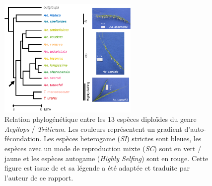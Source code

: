 \documentclass[../main]{subfiles} %
\begin{document}
\addto\extrasfrench{\protected\edef:{\unexpanded\expandafter{:}}}

\begin{figure}[ht]
    \centering
    \includegraphics[width=0.60\textwidth]{./Illustrations/phylogenetic-relationships-modified.png}
    \caption{\tiny Relation phylogénétique entre les 13 espèces diploïdes du genre \textit{Aegilops} / \textit{Triticum}. Les couleurs représentent un gradient d'auto-fécondation. Les espèces heterogame (\textit{SI}) strictes sont bleues, les espèces avec un mode de reproduction mixte (\textit{SC}) sont en vert / jaune et les espèces autogame (\textit{Highly Selfing}) sont en rouge. Cette figure est issue de \cite{burgarella_mating_2024} et sa légende a été adaptée et traduite par l'auteur de ce rapport.}
    \label{fig:Phylo}
\end{figure}


\end{document}
